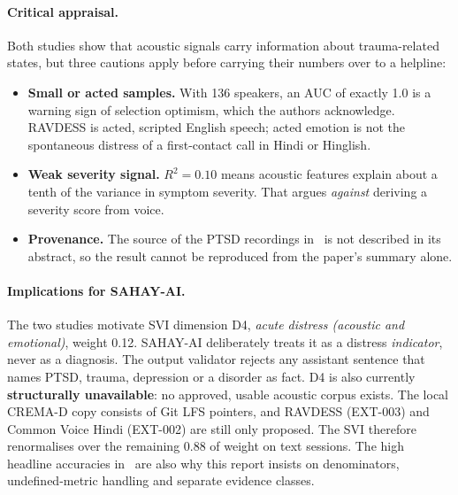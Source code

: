 \documentclass[11pt,a4paper]{article}
\begin{document}
\paragraph{Critical appraisal.}
Both studies show that acoustic signals carry information about trauma-related states, but three
cautions apply before carrying their numbers over to a helpline:
\begin{itemize}
  \item \textbf{Small or acted samples.} With 136 speakers, an AUC of exactly 1.0 is a warning sign
        of selection optimism, which the authors acknowledge. RAVDESS is acted, scripted English
        speech; acted emotion is not the spontaneous distress of a first-contact call in Hindi or
        Hinglish.
  \item \textbf{Weak severity signal.} $R^2 = 0.10$ means acoustic features explain about a tenth
        of the variance in symptom severity. That argues \emph{against} deriving a severity score
        from voice.
  \item \textbf{Provenance.} The source of the PTSD recordings in~\cite{islam2024} is not described
        in its abstract, so the result cannot be reproduced from the paper's summary alone.
\end{itemize}

\paragraph{Implications for SAHAY-AI.}
The two studies motivate SVI dimension D4, \emph{acute distress (acoustic and emotional)}, weight 0.12.
SAHAY-AI deliberately treats it as a distress \emph{indicator}, never as a diagnosis. The output
validator rejects any assistant sentence that names PTSD, trauma, depression or a disorder as fact.
D4 is also currently \textbf{structurally unavailable}: no approved, usable acoustic corpus exists.
The local CREMA-D copy consists of Git LFS pointers, and RAVDESS (EXT-003) and Common Voice Hindi
(EXT-002) are still only proposed. The SVI therefore renormalises over the remaining 0.88 of weight
on text sessions. The high headline accuracies in~\cite{hu2024,islam2024} are also why this report
insists on denominators, undefined-metric handling and separate evidence classes.
\end{document}
